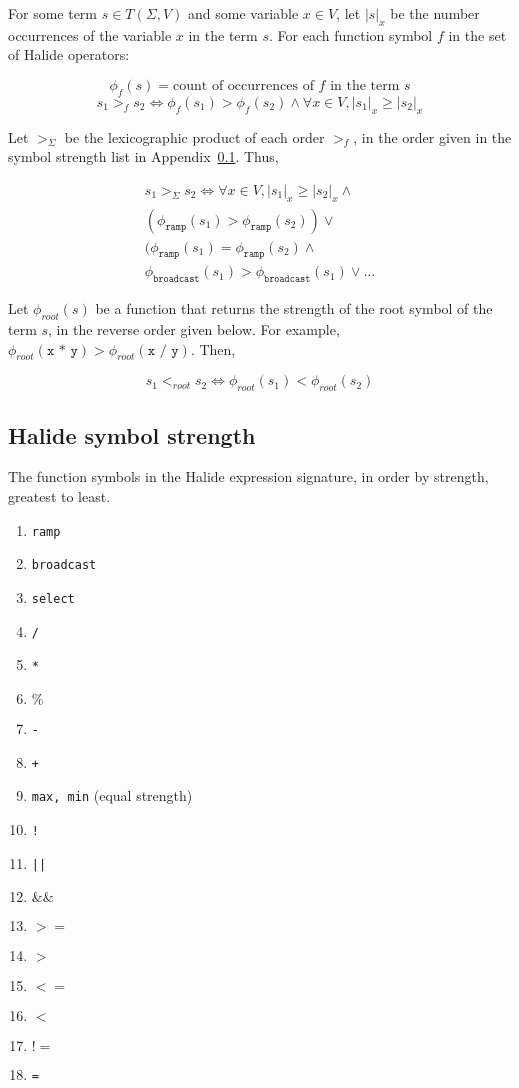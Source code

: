 \documentclass[sigplan,review,anonymous]{acmart}\settopmatter{printfolios=true,printccs=false,printacmref=false}
\begin{document}
For some term $s \in T(\Sigma, V)$ and some variable $x \in V$, let $|s|_x$ be the number occurrences of the variable $x$ in the term $s$. For each function symbol $f$ in the set of Halide operators:

\[
\phi_f(s) = \textrm{count of occurrences of } f \textrm{ in the term } s
\] 
\[
s_1 >_f s_2 \iff \phi_f(s_1) > \phi_f(s_2) \wedge \forall x \in V, |s_1|_x \geq |s_2|_x
\]

Let $>_\Sigma$ be the lexicographic product of each order $>_f$, in the order given in the symbol strength list in Appendix~\ref{symbolstrength}. Thus,

\[
\begin{aligned}
s_1 >_\Sigma s_2 \iff \forall x \in V, |s_1|_x \geq |s_2|_x \wedge \\ (\phi_{\texttt{ramp}}(s_1) > \phi_{\texttt{ramp}}(s_2)) \vee \\ (\phi_{\texttt{ramp}}(s_1) = \phi_{\texttt{ramp}}(s_2) \wedge \\ \phi_{\texttt{broadcast}}(s_1) > \phi_{\texttt{broadcast}}(s_1) \vee \ldots
\end{aligned}
\]

Let $\phi_{root}(s)$ be a function that returns the strength of the root symbol of the term $s$, in the reverse order given below. For example, $\phi_{root}(\texttt{x * y}) > \phi_{root}(\texttt{x / y})$. Then,

\[
s_1 <_{root} s_2 \iff \phi_{root}(s_1) < \phi_{root}(s_2)
\]

\subsection{Halide symbol strength} \label{symbolstrength}

The function symbols in the Halide expression signature, in order by strength, greatest to least.

\begin{enumerate}
  \item \texttt{ramp}
  \item \texttt{broadcast}
  \item \texttt{select}
  \item \texttt{/}
  \item \texttt{*}
  \item \texttt{$\%$}
  \item \texttt{-}
  \item \texttt{+}
  \item \texttt{max, min} (equal strength)
  \item \texttt{!}
  \item \texttt{||}
  \item \texttt{$\&\&$}
  \item \texttt{$>=$}
  \item \texttt{$>$}
  \item \texttt{$<=$}
  \item \texttt{$<$}
  \item \texttt{$!=$}
  \item \texttt{=}
\end{enumerate}
\end{document}

